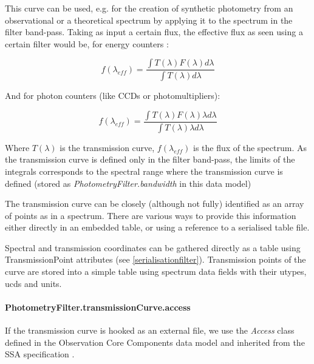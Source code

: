 \documentclass[11pt,a4paper]{ivoa}
\begin{document}

\par

This curve can be used, e.g. for the creation of synthetic photometry
\citep{1996BaltA...5..459S,2004A&A...422..205G} from an observational
or a theoretical spectrum by applying it to the spectrum in the filter band-pass.
Taking as input a certain flux, the effective flux as seen using a certain
filter would be, for energy counters \citep{2007ASPC..364..227M}:

\begin{equation} \label{eq:14}
f(\lambda_{eff}) = \frac{\int T(\lambda)F(\lambda)d\lambda}{\int T(\lambda)d\lambda}
\end{equation}

And for photon counters (like CCDs or photomultipliers):

\begin{equation} \label{eq:15}
f(\lambda_{eff}) = \frac{\int T(\lambda)F(\lambda)\lambda d\lambda}{\int T(\lambda)\lambda d\lambda}
\end{equation}

Where $T(\lambda)$ is the transmission curve, $f(\lambda_{eff})$ is the flux of
the spectrum. As the transmission curve is defined only in the filter
band-pass, the limits of the integrals corresponds to the spectral range where
the transmission curve is defined (stored as \textit{PhotometryFilter.bandwidth}
in this data model)
\par

The transmission curve can be closely (although not fully) identified as an array
of points as in a spectrum. There are various ways to provide this information
either directly in an embedded table, or using a reference to a serialised table
file.
\par

Spectral and transmission coordinates can be gathered directly as a table using
 TransmissionPoint attributes (see \ref{serialisationfilter}). Transmission points
of the curve are stored into a simple table using spectrum data fields with their utypes, ucds and units.
\par

\paragraph{PhotometryFilter.transmissionCurve.access}
If the transmission curve is hooked as an external file, we use the \textit{Access} class
defined in the Observation Core Components data model \citep{2017ivoa.spec.0509L} and inherited
from the SSA specification \citep{2012ivoa.spec.0210T}.
\par
\end{document}
